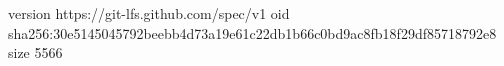 version https://git-lfs.github.com/spec/v1
oid sha256:30e5145045792beebb4d73a19e61c22db1b66c0bd9ac8fb18f29df85718792e8
size 5566
